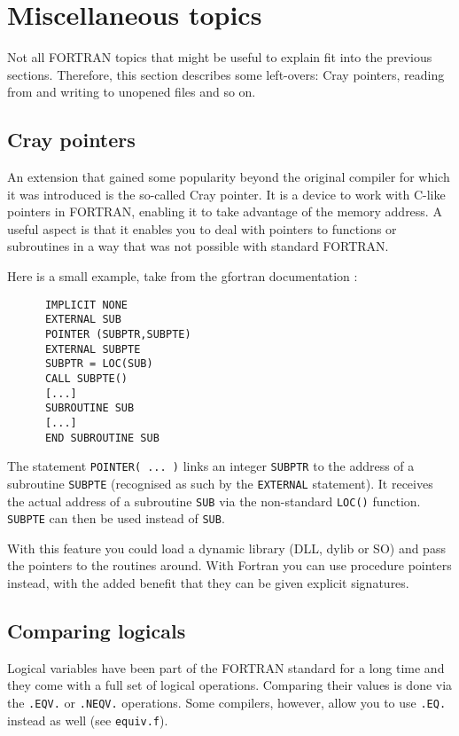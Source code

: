 \section{Miscellaneous topics}
Not all FORTRAN topics that might be useful to explain fit into the previous sections.
Therefore, this section describes some left-overs: Cray pointers, reading from and writing to
unopened files and so on.

\subsection{Cray pointers}
An extension that gained some popularity beyond the original compiler for which it was introduced
is the so-called Cray pointer. It is a device to work with C-like pointers in FORTRAN, enabling
it to take advantage of the memory address. A useful aspect is that it enables you to deal
with pointers to functions or subroutines in a way that was not possible with standard FORTRAN.

Here is a small example, take from the gfortran documentation \cite{F77Cray}:
\begin{verbatim}
      IMPLICIT NONE
      EXTERNAL SUB
      POINTER (SUBPTR,SUBPTE)
      EXTERNAL SUBPTE
      SUBPTR = LOC(SUB)
      CALL SUBPTE()
      [...]
      SUBROUTINE SUB
      [...]
      END SUBROUTINE SUB
\end{verbatim}

The statement \verb+POINTER( ... )+ links an integer \verb+SUBPTR+ to the address of a subroutine
\verb+SUBPTE+ (recognised as such by the \verb+EXTERNAL+ statement). It receives the actual
address of a subroutine \verb+SUB+ via the non-standard \verb+LOC()+ function. \verb+SUBPTE+ can then
be used instead of \verb+SUB+.

With this feature you could load a dynamic library (DLL, dylib or SO) and pass the pointers to the
routines around. With Fortran you can use procedure pointers instead, with the added benefit that
they can be given explicit signatures.

\subsection{Comparing logicals}
Logical variables have been part of the FORTRAN standard for a long time and they come with a full
set of logical operations. Comparing their values is done via the \verb+.EQV.+ or \verb+.NEQV.+ operations.
Some compilers, however, allow you to use \verb+.EQ.+ instead as well (see \verb+equiv.f+).

